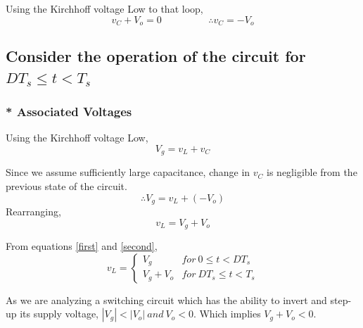 \documentclass[a4paper,11pt]{article}%
\begin{document}
Using the Kirchhoff voltage Low to that loop,
\[	v_C + V_o = 0 \hspace{2cm} \therefore v_C = -V_o \]

%
%
%
%

\subsection*{Consider the operation of the circuit for $DT_s \leq t < T_s$}

\subsubsection*{* Associated Voltages}
Using the Kirchhoff voltage Low,
\[ V_g = v_L + v_C \]

Since we assume sufficiently large capacitance, change in $v_C$ is negligible from the previous state of the circuit.
\[\therefore  V_g = v_L + (-V_o) \]
Rearranging,
\begin{equation}
	v_L = V_g + V_o
	\label{second}
\end{equation}

From equations \eqref{first} and \eqref{second},
\begin{equation*}
	v_L = \begin{cases}
		V_g & for~0\leq t < DT_s\\
		V_g + V_o & for~DT_s \leq t < T_s
	\end{cases}
\end{equation*}

As we are analyzing a switching circuit which has the ability to invert and step-up its supply voltage, $|V_g| < |V_o| ~and~ V_o < 0 $. Which implies $V_g + V_o < 0$.
\end{document}
